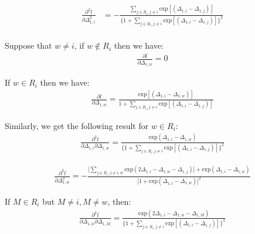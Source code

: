 \documentclass[]{article}
\begin{document}
\begin{equation}\begin{aligned}\label{eqn:secderivofPart}
\frac{\partial^2 l}{\partial \Delta_{1,i}^2} &= -\frac{\sum_{j\in R_i, j \ne i}^{}{}\text{exp}[(\Delta_{1,i}-\Delta_{1,j})]}{\big \{1+\sum_{j\in R_i, j \ne i}^{}{}\text{exp}[(\Delta_{1,i}-\Delta_{1,j})]\big \}^2 }
\\
\end{aligned}\end{equation}

Suppose that \(w\ne i\), if \(w\notin R_i\) then we have:
\begin{equation}\begin{aligned}\label{eqn:easyderiveforwnotini}
\frac{\partial l}{\partial \Delta_{1,w}} = 0
\end{aligned}\end{equation}

If \(w\in R_i\) then we have:
\begin{equation}\begin{aligned}\label{eqn:secderivofPart3}
\frac{\partial l}{\partial \Delta_{1,w}} = \frac{\text{exp}[(\Delta_{1,i}-\Delta_{1,w})]}{1+\sum_{j\in R_i, j \ne i}^{}{}\text{exp}[(\Delta_{1,i}-\Delta_{1,j})]}
\end{aligned}\end{equation}

Similarly, we get the following result for \(w\in R_i\):
\begin{equation}\begin{aligned}\label{eqn:result_forsecdr}
\frac{\partial^2 l}{\partial \Delta_{1,i} \partial \Delta_{1,w}} = \frac{\text{exp}(\Delta_{1,i}-\Delta_{1,w})}{\big\{1+\sum_{j\in R_i, j \ne i}^{}{}\text{exp}[(\Delta_{1,i}-\Delta_{1,j})]\big \}^2}
\end{aligned}\end{equation}

\begin{equation}\begin{aligned}\label{eqn:result_forsecdr2}
\frac{\partial^2 l}{\partial \Delta_{1,w}^2} = -\frac{\big[\sum_{j \in R_i, j \neq i,w}^{} \text{exp} (2\Delta_{1,i}-\Delta_{1,w}-\Delta_{1,j}) \big] + \text{exp}(\Delta_{1,i}-\Delta_{1,w})}{\big[1+\text{exp}(\Delta_{1,i}-\Delta_{1,w})\big]^2}
\end{aligned}\end{equation}

If \(M \in R_i\) but \(M\neq i, M\neq w\), then:
\begin{equation}\begin{aligned}\label{eqn:result_forsecdrlast}
\frac{\partial^2 l}{\partial \Delta_{1,w} \partial \Delta_{1,M}} = \frac{\text{exp}(2\Delta_{1,i}-\Delta_{1,w}-\Delta_{1,M})}{\big\{1+\sum_{j\in R_i, j \ne i}^{}{}\text{exp}[(\Delta_{1,i}-\Delta_{1,j})]\big \}^2}
\end{aligned}\end{equation}
\end{document}
